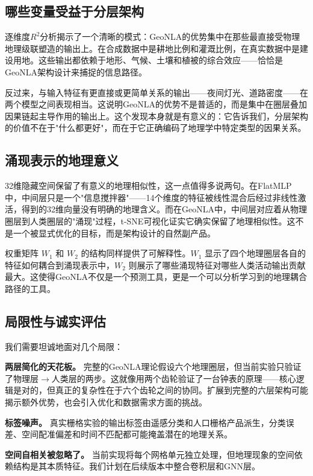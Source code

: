 \documentclass[11pt,a4paper]{article}
\begin{document}
\subsection{哪些变量受益于分层架构}

逐维度$R^2$分析揭示了一个清晰的模式：GeoNLA的优势集中在那些最直接受物理地理级联塑造的输出上。在合成数据中是耕地比例和灌溉比例，在真实数据中是建设用地。这些输出都依赖于地形、气候、土壤和植被的综合效应——恰恰是GeoNLA架构设计来捕捉的信息路径。

反过来，与输入特征有更直接或更简单关系的输出——夜间灯光、道路密度——在两个模型之间表现相当。这说明GeoNLA的优势不是普适的，而是集中在圈层叠加因果链起主导作用的输出上。这个发现本身就是有意义的：它告诉我们，分层架构的价值不在于"什么都更好"，而在于它正确编码了地理学中特定类型的因果关系。

\subsection{涌现表示的地理意义}

32维隐藏空间保留了有意义的地理相似性，这一点值得多说两句。在FlatMLP中，中间层只是一个"信息搅拌器"——14个维度的特征被线性混合后经过非线性激活，得到的32维向量没有明确的地理含义。而在GeoNLA中，中间层对应着从物理圈层到人类圈层的"涌现"过程，t-SNE可视化证实它确实保留了地理相似性。这不是一个被显式优化的目标，而是架构设计的自然副产品。

权重矩阵 $W_1$ 和 $W_2$ 的结构同样提供了可解释性。$W_1$ 显示了四个地理圈层各自的特征如何耦合到涌现表示中，$W_2$ 则展示了哪些涌现特征对哪些人类活动输出贡献最大。这使得GeoNLA不仅是一个预测工具，更是一个可以分析学习到的地理耦合路径的工具。

\subsection{局限性与诚实评估}

我们需要坦诚地面对几个局限：

\textbf{两层简化的天花板。} 完整的GeoNLA理论假设六个地理圈层，但当前实验只验证了物理层$\to$人类层的两步。这就像用两个齿轮验证了一台钟表的原理——核心逻辑是对的，但真正的复杂性在于六个齿轮之间的协同。扩展到完整的六层架构可能揭示额外优势，也会引入优化和数据需求方面的挑战。

\textbf{标签噪声。} 真实栅格实验的输出标签由遥感分类和人口栅格产品派生，分类误差、空间配准偏差和时间不匹配都可能掩盖潜在的地理关系。

\textbf{空间自相关被忽略了。} 当前实现将每个网格单元独立处理，但地理现象的空间依赖结构是其本质特征。我们计划在后续版本中整合卷积层和GNN层。
\end{document}
